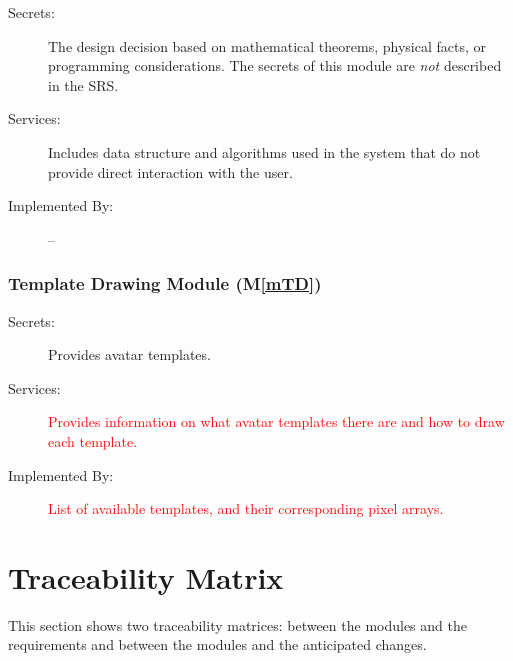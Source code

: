 \documentclass[12pt, titlepage]{article}
\newcommand{\mref}[1]{M\ref{#1}}
\begin{document}
\begin{description}
\item[Secrets:] The design decision based on mathematical theorems, physical
  facts, or programming considerations. The secrets of this module are
  \emph{not} described in the SRS.
\item[Services:] Includes data structure and algorithms used in the system that
  do not provide direct interaction with the user.
\item[Implemented By:] --
\end{description}

\subsubsection{Template Drawing Module (\mref{mTD})}

\begin{description}
\item[Secrets:]Provides avatar templates.
\item[Services:]\textcolor{red}{Provides information on what avatar templates there are and how to draw each template.}
\item[Implemented By:]\textcolor{red}{List of available templates, and their corresponding pixel arrays.}
\end{description}


\section{Traceability Matrix} \label{SecTM}

This section shows two traceability matrices: between the modules and the
requirements and between the modules and the anticipated changes.
\end{document}
